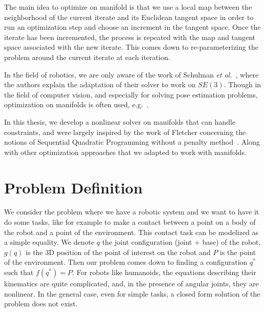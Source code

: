 The main idea to optimize on manifold is that we use a local map between the neighborhood of the current iterate and its Euclidean tangent space in order to run an optimization step and choose an increment in the tangent space.
Once the iterate has been incremented, the process is repeated with the map and tangent space associated with the new iterate.
This comes down to re-parameterizing the problem around the current iterate at each iteration.

In the field of robotics, we are only aware of the work of Schulman \emph{et al.}~\cite{Schulman2014}, where the authors explain the adaptation of their solver to work on $SE(3)$.
Though in the field of computer vision, and especially for solving pose estimation problems, optimization on manifolds is often used, e.g.~\cite{hertzberg2011, lu2000fast}.

In this thesis, we develop a nonlinear solver on manifolds that can handle constraints, and were largely inspired by the work of Fletcher concerning the notions of Sequential Quadratic Programming without a penalty method~\cite{Fletcher:ifip:2006, fletcher2010sequential, fletcher:mathprog:2000}.
Along with other optimization approaches that we adapted to work with manifolds.

\section{Problem Definition}
\label{sec:problem_definition}


We consider the problem where we have a robotic system and we want to have it do some tasks, like for example to make a contact between a point on a body of the robot and a point of the environment.
This contact task can be modelized as a simple equality.
We denote $q$ the joint configuration (joint + base) of the robot, $g(q)$ is the 3D position of the point of interest on the robot and $P$ is the point of the environment.
Then our problem comes down to finding a configuration $q^*$ such that $f(q^*) = P$.
For robots like humanoids, the equations describing their kinematics are quite complicated, and, in the presence of angular joints, they are nonlinear.
In the general case, even for simple tasks, a closed form solution of the problem does not exist.

